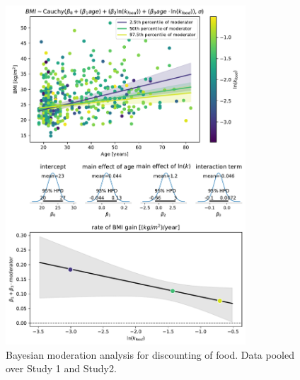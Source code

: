 \documentclass[12pt, a4paper]{article}
\begin{document}
\begin{figure} 
	\centering
	\includegraphics[width=0.8\textwidth]{meta_analysis/meta analysis bmi~age*food.pdf} 
	\caption{Bayesian moderation analysis for discounting of food. Data pooled over Study 1 and Study2.}
	\label{fig:meta_food}
\end{figure}




\end{document}
